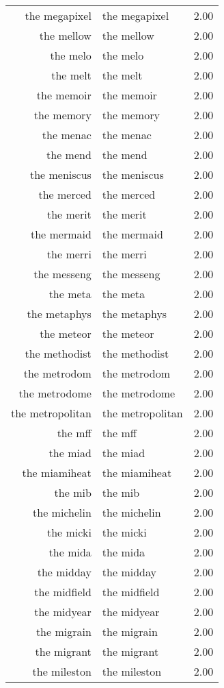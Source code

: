 \begin{table}[ht]
\begin{tabular}{rlr}
  the megapixel & the megapixel & 2.00 \\ 
  the mellow & the mellow & 2.00 \\ 
  the melo & the melo & 2.00 \\ 
  the melt & the melt & 2.00 \\ 
  the memoir & the memoir & 2.00 \\ 
  the memory & the memory & 2.00 \\ 
  the menac & the menac & 2.00 \\ 
  the mend & the mend & 2.00 \\ 
  the meniscus & the meniscus & 2.00 \\ 
  the merced & the merced & 2.00 \\ 
  the merit & the merit & 2.00 \\ 
  the mermaid & the mermaid & 2.00 \\ 
  the merri & the merri & 2.00 \\ 
  the messeng & the messeng & 2.00 \\ 
  the meta & the meta & 2.00 \\ 
  the metaphys & the metaphys & 2.00 \\ 
  the meteor & the meteor & 2.00 \\ 
  the methodist & the methodist & 2.00 \\ 
  the metrodom & the metrodom & 2.00 \\ 
  the metrodome & the metrodome & 2.00 \\ 
  the metropolitan & the metropolitan & 2.00 \\ 
  the mff & the mff & 2.00 \\ 
  the miad & the miad & 2.00 \\ 
  the miamiheat & the miamiheat & 2.00 \\ 
  the mib & the mib & 2.00 \\ 
  the michelin & the michelin & 2.00 \\ 
  the micki & the micki & 2.00 \\ 
  the mida & the mida & 2.00 \\ 
  the midday & the midday & 2.00 \\ 
  the midfield & the midfield & 2.00 \\ 
  the midyear & the midyear & 2.00 \\ 
  the migrain & the migrain & 2.00 \\ 
  the migrant & the migrant & 2.00 \\ 
  the mileston & the mileston & 2.00 \\ 

\end{tabular}
\end{table}
